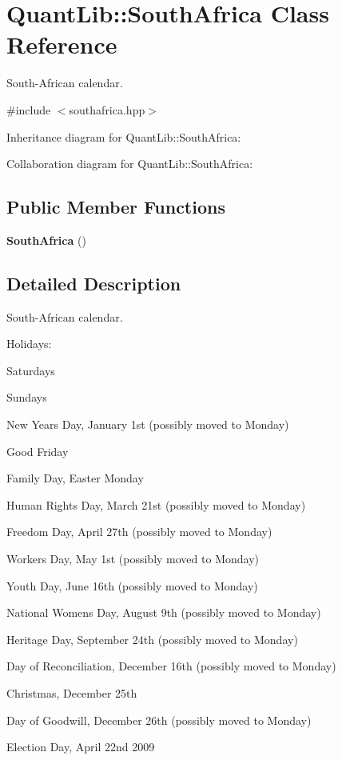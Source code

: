 \section{Quant\+Lib\+:\+:South\+Africa Class Reference}
\label{class_quant_lib_1_1_south_africa}


South-\/\+African calendar.  




{\ttfamily \#include $<$southafrica.\+hpp$>$}



Inheritance diagram for Quant\+Lib\+:\+:South\+Africa\+:


Collaboration diagram for Quant\+Lib\+:\+:South\+Africa\+:
\subsection*{Public Member Functions}
\begin{DoxyCompactItemize}
\item 
{\bf South\+Africa} ()
\end{DoxyCompactItemize}


\subsection{Detailed Description}
South-\/\+African calendar. 

Holidays\+: 
\begin{DoxyItemize}
\item Saturdays 
\item Sundays 
\item New Year\textquotesingle{}s Day, January 1st (possibly moved to Monday) 
\item Good Friday 
\item Family Day, Easter Monday 
\item Human Rights Day, March 21st (possibly moved to Monday) 
\item Freedom Day, April 27th (possibly moved to Monday) 
\item Workers Day, May 1st (possibly moved to Monday) 
\item Youth Day, June 16th (possibly moved to Monday) 
\item National Women\textquotesingle{}s Day, August 9th (possibly moved to Monday) 
\item Heritage Day, September 24th (possibly moved to Monday) 
\item Day of Reconciliation, December 16th (possibly moved to Monday) 
\item Christmas, December 25th  
\item Day of Goodwill, December 26th (possibly moved to Monday) 
\item Election Day, April 22nd 2009 
\end{DoxyItemize}

